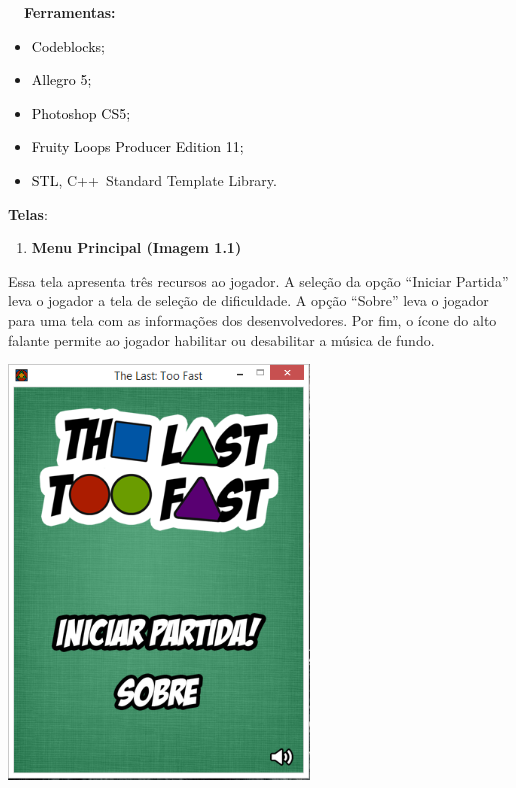 \documentclass[a4paper]{article}
\newcommand\liststyleWWNumv{%
\renewcommand\labelitemi{[F0B7?]}
\renewcommand\labelitemii{o}
\renewcommand\labelitemiii{[F0A7?]}
\renewcommand\labelitemiv{[F0B7?]}
}
\newcommand\liststyleWWNumvii{%
\renewcommand\labelitemi{[F0B7?]}
\renewcommand\labelitemii{o}
\renewcommand\labelitemiii{[F0A7?]}
\renewcommand\labelitemiv{[F0B7?]}
}
\newcommand\liststyleWWNumiii{%
\renewcommand\theenumi{\arabic{enumi}}
\renewcommand\theenumii{\alph{enumii}}
\renewcommand\theenumiii{\roman{enumiii}}
\renewcommand\theenumiv{\arabic{enumiv}}
\renewcommand\labelenumi{\theenumi.}
\renewcommand\labelenumii{\theenumii.}
\renewcommand\labelenumiii{\theenumiii.}
\renewcommand\labelenumiv{\theenumiv.}
}
\newcounter{Imagem2}
\newcounter{Imagem1}
\begin{document}
\bigskip

\textbf{\ \ Ferramentas:}

\liststyleWWNumv
\begin{itemize}
\item \textcolor{black}{Codeblocks;}
\item \textcolor{black}{Allegro 5;}
\item \textcolor{black}{Photoshop CS5;}
\item \textcolor{black}{Fruity Loops Producer Edition 11;}
\end{itemize}
\liststyleWWNumvii
\begin{itemize}
\item
\foreignlanguage{english}{\textcolor{black}{STL}}\foreignlanguage{english}{,
C++~Standard Template
Library}\foreignlanguage{english}{\textcolor{black}{. }}
\end{itemize}
\textbf{Telas}:

\liststyleWWNumiii
\begin{enumerate}
\item \textbf{Menu Principal (Imagem 1.1)}
\end{enumerate}
Essa tela apresenta três recursos ao jogador. A seleção da opção
“Iniciar Partida” leva o jogador a tela de seleção de dificuldade. A
opção “Sobre” leva o jogador para uma tela com as informações dos
desenvolvedores. Por fim, o ícone do alto falante permite ao jogador
habilitar ou desabilitar a música de fundo.

{\centering 
\includegraphics[width=3.148in,height=4.3307in]{T1-img2.png} \par}
\end{document}
